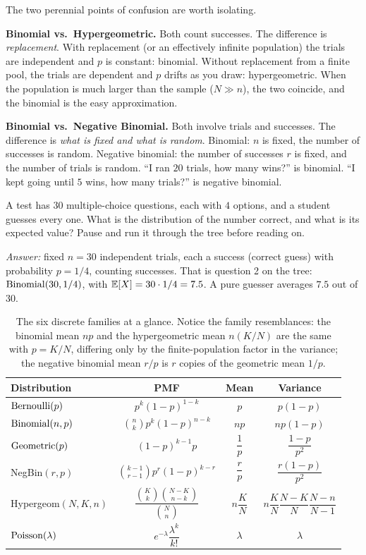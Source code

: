 The two perennial points of confusion are worth isolating.

\begin{trapbox}
\textbf{Binomial vs.\ Hypergeometric.} Both count successes. The difference is
\emph{replacement}. With replacement (or an effectively infinite population) the
trials are independent and $p$ is constant: binomial. Without replacement from a
finite pool, the trials are dependent and $p$ drifts as you draw: hypergeometric.
When the population is much larger than the sample ($N \gg n$), the two coincide,
and the binomial is the easy approximation.

\textbf{Binomial vs.\ Negative Binomial.} Both involve trials and successes. The
difference is \emph{what is fixed and what is random}. Binomial: $n$ is fixed, the
number of successes is random. Negative binomial: the number of successes $r$ is
fixed, and the number of trials is random. ``I ran $20$ trials, how many wins?'' is
binomial. ``I kept going until $5$ wins, how many trials?'' is negative binomial.
\end{trapbox}

\begin{walkbox}
A test has $30$ multiple-choice questions, each with $4$ options, and a student
guesses every one. What is the distribution of the number correct, and what is its
expected value? Pause and run it through the tree before reading on.

\emph{Answer:} fixed $n = 30$ independent trials, each a success (correct guess)
with probability $p = 1/4$, counting successes. That is question 2 on the tree:
$\operatorname{Binomial}(30, 1/4)$, with $\operatorname{\mathbb{E}}[X] = 30 \cdot 1/4 = 7.5$. A pure guesser averages $7.5$
out of $30$.
\end{walkbox}

\begin{table}[H]
\centering
\renewcommand{\arraystretch}{1.5}
\begin{tabular}{@{}lccc@{}}
\toprule
\textbf{Distribution} & \textbf{PMF} & \textbf{Mean} & \textbf{Variance} \\
\midrule
$\operatorname{Bernoulli}(p)$ & $p^k(1-p)^{1-k}$ & $p$ & $p(1-p)$ \\
$\operatorname{Binomial}(n,p)$ & $\binom{n}{k}p^k(1-p)^{n-k}$ & $np$ & $np(1-p)$ \\
$\operatorname{Geometric}(p)$ & $(1-p)^{k-1}p$ & $\dfrac{1}{p}$ & $\dfrac{1-p}{p^2}$ \\
NegBin$(r,p)$ & $\binom{k-1}{r-1}p^r(1-p)^{k-r}$ & $\dfrac{r}{p}$ & $\dfrac{r(1-p)}{p^2}$ \\
Hypergeom$(N,K,n)$ & $\dfrac{\binom{K}{k}\binom{N-K}{n-k}}{\binom{N}{n}}$ & $n\dfrac{K}{N}$ & $n\dfrac{K}{N}\dfrac{N-K}{N}\dfrac{N-n}{N-1}$ \\
$\operatorname{Poisson}(\lambda)$ & $e^{-\lambda}\dfrac{\lambda^k}{k!}$ & $\lambda$ & $\lambda$ \\
\bottomrule
\end{tabular}
\caption{The six discrete families at a glance. Notice the family resemblances:
the binomial mean $np$ and the hypergeometric mean $n(K/N)$ are the same with
$p = K/N$, differing only by the finite-population factor in the variance; the
negative binomial mean $r/p$ is $r$ copies of the geometric mean $1/p$.}
\label{ch07:tab-summary}
\end{table}

